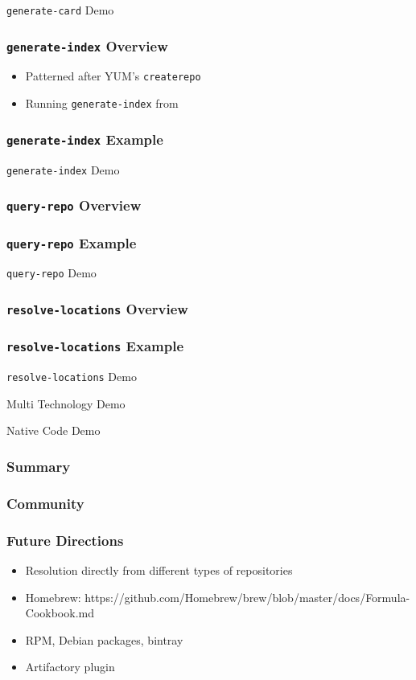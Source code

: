 \documentclass{beamer}
\begin{document}
\begin{frame}
  \centerline{\color{blue}\Large \texttt{generate-card} Demo}
\end{frame}
\begin{frame}
  \frametitle{\texttt{generate-index} Overview}
  \begin{itemize}
  \item Patterned after YUM's \texttt{createrepo}
  \item Running \texttt{generate-index} from 
  \end{itemize}
\end{frame}
\begin{frame}
  \frametitle{\texttt{generate-index} Example}
\end{frame}
\begin{frame}
  \centerline{\color{blue}\Large \texttt{generate-index} Demo}
\end{frame}
\begin{frame}
  \frametitle{\texttt{query-repo} Overview}
\end{frame}
\begin{frame}
  \frametitle{\texttt{query-repo} Example}
\end{frame}
\begin{frame}
  \centerline{\color{blue}\Large \texttt{query-repo} Demo}
\end{frame}
\begin{frame}
  \frametitle{\texttt{resolve-locations} Overview}
\end{frame}
\begin{frame}
  \frametitle{\texttt{resolve-locations} Example}
\end{frame}
\begin{frame}
  \centerline{\color{blue}\Large \texttt{resolve-locations} Demo}
\end{frame}
\begin{frame}
  \centerline{\color{blue}\Large Multi Technology Demo}
\end{frame}
\begin{frame}
  \centerline{\color{blue}\Large Native Code Demo}
\end{frame}
\begin{frame}
  \frametitle{Summary}
\end{frame}
\begin{frame}
  \frametitle{Community}
\end{frame}
\begin{frame}
  \frametitle{Future Directions}
  \begin{itemize}
  \item Resolution directly from different types of repositories
  \item Homebrew: https://github.com/Homebrew/brew/blob/master/docs/Formula-Cookbook.md
  \item RPM, Debian packages, bintray
  \item Artifactory plugin
  \end{itemize}
\end{frame}
\end{document}
